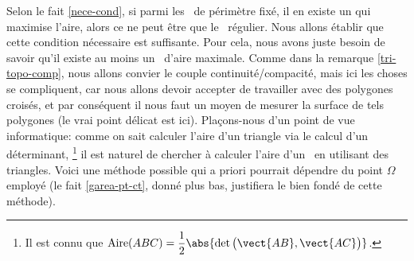 Selon le fait \ref{nece-cond}, si parmi les \ngones\ de périmètre fixé, il en existe un qui maximise l'aire, alors ce ne peut être que le \ngone\ régulier. Nous allons établir que cette condition nécessaire est suffisante. Pour cela, nous avons juste besoin de savoir qu'il existe au moins un \ngone\ d'aire maximale.
Comme dans la remarque \ref{tri-topo-comp}, nous allons convier le couple continuité/compacité, mais ici les choses se compliquent, car nous allons devoir accepter de travailler avec des polygones croisés, et par conséquent il nous faut un moyen de mesurer la surface de tels polygones (le vrai point délicat est ici). 
Plaçons-nous d'un point de vue informatique: comme on sait calculer l'aire d'un triangle via le calcul d'un déterminant,%
\footnote{
	Il est connu que $\area{ABC} = \dfrac12 \abs{\det \big( \vect{AB} , \vect{AC} \big)}$.
}
il est naturel de chercher à calculer l'aire d'un \ngone\ en utilisant des triangles. Voici une méthode possible qui a priori pourrait dépendre du point $\Omega$ employé (le fait \ref{garea-pt-ct}, donné plus bas, justifiera le bien fondé de cette méthode).

